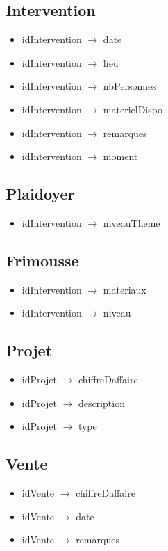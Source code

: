 \documentclass[asi, sansVersion]{picInsa}
\begin{document}
\subsection*{Intervention}
\begin{itemize}
\item[]	idIntervention $\rightarrow$ date
\item[]	idIntervention $\rightarrow$ lieu
\item[]	idIntervention $\rightarrow$ nbPersonnes
\item[]	idIntervention $\rightarrow$ materielDispo
\item[]	idIntervention $\rightarrow$ remarques
\item[]	idIntervention $\rightarrow$ moment
\end{itemize}

\subsection*{Plaidoyer}
\begin{itemize}
\item[]	idIntervention $\rightarrow$ niveauTheme
\end{itemize}

\subsection*{Frimousse}
\begin{itemize}
\item[]	idIntervention $\rightarrow$ materiaux
\item[] idIntervention $\rightarrow$ niveau
\end{itemize}

\subsection*{Projet}
\begin{itemize}
\item[] idProjet $\rightarrow$ chiffreDaffaire
\item[] idProjet $\rightarrow$ description
\item[] idProjet $\rightarrow$ type
\end{itemize}

\subsection*{Vente}
\begin{itemize}
\item[]	idVente $\rightarrow$ chiffreDaffaire
\item[]	idVente $\rightarrow$ date
\item[]	idVente $\rightarrow$ remarques
\end{itemize}
\end{document}
